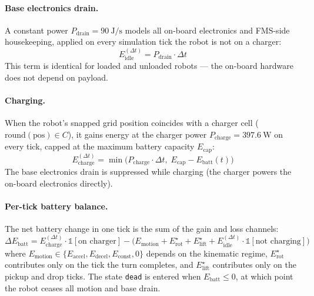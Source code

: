 \documentclass[conference]{IEEEtran}
\begin{document}
\paragraph{Base electronics drain.}
A constant power $P_\text{drain} = \SI{90}{\joule\per\second}$ models all on-board electronics and FMS-side housekeeping, applied on every simulation tick the robot is not on a charger:
\begin{equation}
  E_\text{idle}^{(\Delta t)} = P_\text{drain} \cdot \Delta t
  \label{eq:e_idle}
\end{equation}
This term is identical for loaded and unloaded robots --- the on-board hardware does not depend on payload.

\paragraph{Charging.}
When the robot's snapped grid position coincides with a charger cell ($\text{round}(\text{pos}) \in C$), it gains energy at the charger power $P_\text{charge} = \SI{397.6}{\watt}$ on every tick, capped at the maximum battery capacity $E_\text{cap}$:
\begin{equation}
  E_\text{charge}^{(\Delta t)} = \min\!\Big( P_\text{charge} \cdot \Delta t,\; E_\text{cap} - E_\text{batt}(t) \Big)
\end{equation}
The base electronics drain is suppressed while charging (the charger powers the on-board electronics directly).

\paragraph{Per-tick battery balance.}
The net battery change in one tick is the sum of the gain and loss channels:
\begin{equation}
  \Delta E_\text{batt} = E_\text{charge}^{(\Delta t)} \cdot \mathbb{1}[\text{on charger}] - \Big( E_\text{motion} + E_\text{rot}^\star + E_\text{lift}^\star + E_\text{idle}^{(\Delta t)} \cdot \mathbb{1}[\text{not charging}] \Big)
  \label{eq:per_tick_balance}
\end{equation}
where $E_\text{motion} \in \{E_\text{accel}, E_\text{decel}, E_\text{const}, 0\}$ depends on the kinematic regime, $E_\text{rot}^\star$ contributes only on the tick the turn completes, and $E_\text{lift}^\star$ contributes only on the pickup and drop ticks. The state \texttt{dead} is entered when $E_\text{batt} \leq 0$, at which point the robot ceases all motion and base drain.
\end{document}

